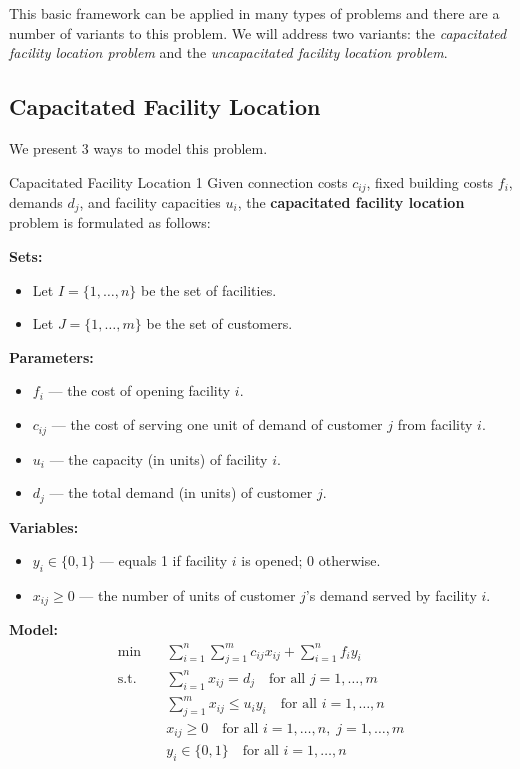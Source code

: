 This basic framework can be applied in many types of problems and there are a number of variants to this problem.   We will address two variants: the \emph{capacitated facility location problem} and the \emph{uncapacitated facility location problem}.  



\subsection{Capacitated Facility Location}
We present 3 ways to model this problem.

\begin{general}{Capacitated Facility Location 1}{\npcomplete}
Given connection costs \( c_{ij} \), fixed building costs \( f_i \), demands \( d_j \), and facility capacities \( u_i \), the \textbf{capacitated facility location} problem is formulated as follows:

\noindent \textbf{Sets:}
\begin{itemize}
\item Let \( I = \{1,\dots, n\} \) be the set of facilities.
\item Let \( J = \{1, \dots, m\} \) be the set of customers.
\end{itemize}

\noindent \textbf{Parameters:}
\begin{itemize}
\item \( f_i \) — the cost of opening facility \( i \).
\item \( c_{ij} \) — the cost of serving one unit of demand of customer \( j \) from facility \( i \).
\item \( u_i \) — the capacity (in units) of facility \( i \).
\item \( d_j \) — the total demand (in units) of customer \( j \).
\end{itemize}

\noindent \textbf{Variables:}
\begin{itemize}
\item \( y_i \in \{0,1\} \) — equals 1 if facility \( i \) is opened; 0 otherwise.
\item \( x_{ij} \geq 0 \) — the number of units of customer \( j \)'s demand served by facility \( i \).
\end{itemize}

\noindent \textbf{Model:}
\begin{align}
\min \quad & \sum_{i=1}^n \sum_{j=1}^m c_{ij} x_{ij} + \sum_{i=1}^n f_i y_i \tag{Total cost} \\
\text{s.t.} \quad & \sum_{i=1}^n x_{ij} = d_j \quad \text{for all } j = 1,\dots,m \tag{Meet demand} \\
& \sum_{j=1}^m x_{ij} \leq u_i y_i \quad \text{for all } i = 1,\dots,n \tag{Facility capacity} \\
& x_{ij} \geq 0 \quad \text{for all } i = 1,\dots,n,\; j = 1,\dots,m \tag{Nonnegativity} \\
& y_i \in \{0,1\} \quad \text{for all } i = 1,\dots,n \tag{Open facility}
\end{align}

\end{general}

